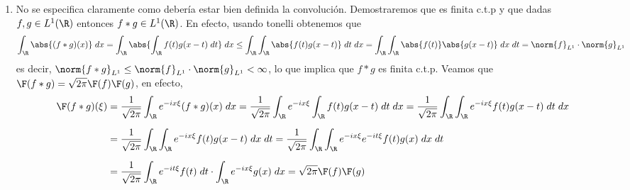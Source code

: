\documentclass{article}
\begin{document}
\begin{enumerate}
    \item No se especifica claramente como debería estar bien definida la convolución. 
    Demostraremos que es finita c.t.p y que dadas $f,g\in L^{1}(\R)$ entonces $f*g\in L^{1}(\R)$. 
    En efecto, usando tonelli obtenemos que
    \begin{equation*}
        \int_{\R}\abs{(f*g)(x)}\hspace{1mm}dx
        =\int_{\R}\abs{\int_{\R}f(t)g(x-t)\hspace{1mm}dt}\hspace{1mm}dx
        \leq\int_{\R}\int_{\R}\abs{f(t)g(x-t)}\hspace{1mm}dt\hspace{1mm}dx
        =\int_{\R}\int_{\R}\abs{f(t)}\abs{g(x-t)}\hspace{1mm}dx\hspace{1mm}dt
        =\norm{f}_{L^{1}}\cdot\norm{g}_{L^{1}}
    \end{equation*}
    es decir, $\norm{f*g}_{L^{1}}\leq\norm{f}_{L^{1}}\cdot\norm{g}_{L^{1}}<\infty$, lo que implica
    que $f*g$ es finita c.t.p. Veamos que $\F(f*g)=\sqrt{2\pi}\F(f)\F(g)$, en efecto,
    \begin{align*}
        \F(f*g)(\xi) &= \frac{1}{\sqrt{2\pi}}\int_{\R}e^{-ix\xi}(f*g)(x)\hspace{1mm}dx
        =\frac{1}{\sqrt{2\pi}}\int_{\R}e^{-ix\xi}\int_{\R}f(t)g(x-t)\hspace{1mm}dt\hspace{1mm}dx
        =\frac{1}{\sqrt{2\pi}}\int_{\R}\int_{\R}e^{-ix\xi}f(t)g(x-t)\hspace{1mm}dt\hspace{1mm}dx 
        \\[2mm]
        &= \frac{1}{\sqrt{2\pi}}\int_{\R}\int_{\R}e^{-ix\xi}f(t)g(x-t)\hspace{1mm}dx\hspace{1mm}dt
        =\frac{1}{\sqrt{2\pi}}\int_{\R}\int_{\R}
        e^{-ix\xi}e^{-it\xi}f(t)g(x)\hspace{1mm}dx\hspace{1mm}dt \\[2mm]
        &= \frac{1}{\sqrt{2\pi}}\int_{\R}e^{-it\xi}f(t)\hspace{1mm}dt
        \cdot\int_{\R}e^{-ix\xi}g(x)\hspace{1mm}dx=\sqrt{2\pi}\F(f)\F(g)
    \end{align*}
\end{enumerate}

\newpage
\end{document}
